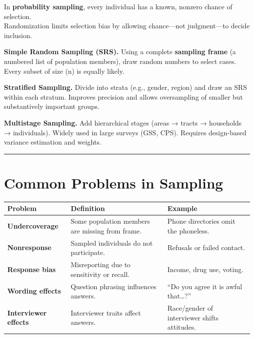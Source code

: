 \documentclass[
  letterpaper,
  DIV=11,
  numbers=noendperiod]{scrreprt}
\begin{document}
In \textbf{probability sampling}, every individual has a known, nonzero
chance of selection.\\
Randomization limits selection bias by allowing chance---not
judgment---to decide inclusion.

\textbf{Simple Random Sampling (SRS).} Using a complete \textbf{sampling
frame} (a numbered list of population members), draw random numbers to
select cases. Every subset of size (n) is equally likely.

\textbf{Stratified Sampling.} Divide into strata (e.g., gender, region)
and draw an SRS within each stratum. Improves precision and allows
oversampling of smaller but substantively important groups.

\textbf{Multistage Sampling.} Add hierarchical stages (areas → tracts →
households → individuals). Widely used in large surveys (GSS, CPS).
Requires design-based variance estimation and weights.

\begin{center}\rule{0.5\linewidth}{0.5pt}\end{center}

\section{Common Problems in Sampling}\label{common-problems-in-sampling}

\begin{longtable}[]{@{}
  >{\raggedright\arraybackslash}p{}
  >{\raggedright\arraybackslash}p{}
  >{\raggedright\arraybackslash}p{}@{}}
\toprule\noalign{}
\begin{minipage}[b]{\linewidth}\raggedright
\textbf{Problem}
\end{minipage} & \begin{minipage}[b]{\linewidth}\raggedright
\textbf{Definition}
\end{minipage} & \begin{minipage}[b]{\linewidth}\raggedright
\textbf{Example}
\end{minipage} \\
\midrule\noalign{}
\endhead
\bottomrule\noalign{}
\endlastfoot
\textbf{Undercoverage} & Some population members are missing from frame.
& Phone directories omit the phoneless. \\
\textbf{Nonresponse} & Sampled individuals do not participate. &
Refusals or failed contact. \\
\textbf{Response bias} & Misreporting due to sensitivity or recall. &
Income, drug use, voting. \\
\textbf{Wording effects} & Question phrasing influences answers. & ``Do
you agree it is awful that\ldots?'' \\
\textbf{Interviewer effects} & Interviewer traits affect answers. &
Race/gender of interviewer shifts attitudes. \\
\end{longtable}
\end{document}
